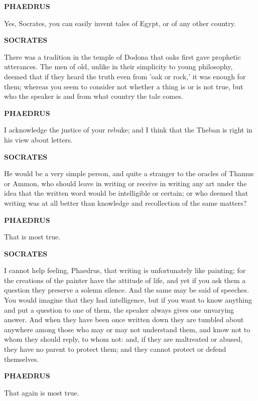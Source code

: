 \documentclass[11pt,letter]{article}
\begin{document}
\par \textbf{PHAEDRUS}
\par   Yes, Socrates, you can easily invent tales of Egypt, or of any other country.

\par \textbf{SOCRATES}
\par   There was a tradition in the temple of Dodona that oaks first gave prophetic utterances. The men of old, unlike in their simplicity to young philosophy, deemed that if they heard the truth even from 'oak or rock,' it was enough for them; whereas you seem to consider not whether a thing is or is not true, but who the speaker is and from what country the tale comes.

\par \textbf{PHAEDRUS}
\par   I acknowledge the justice of your rebuke; and I think that the Theban is right in his view about letters.

\par \textbf{SOCRATES}
\par   He would be a very simple person, and quite a stranger to the oracles of Thamus or Ammon, who should leave in writing or receive in writing any art under the idea that the written word would be intelligible or certain; or who deemed that writing was at all better than knowledge and recollection of the same matters?

\par \textbf{PHAEDRUS}
\par   That is most true.

\par \textbf{SOCRATES}
\par   I cannot help feeling, Phaedrus, that writing is unfortunately like painting; for the creations of the painter have the attitude of life, and yet if you ask them a question they preserve a solemn silence. And the same may be said of speeches. You would imagine that they had intelligence, but if you want to know anything and put a question to one of them, the speaker always gives one unvarying answer. And when they have been once written down they are tumbled about anywhere among those who may or may not understand them, and know not to whom they should reply, to whom not:  and, if they are maltreated or abused, they have no parent to protect them; and they cannot protect or defend themselves.

\par \textbf{PHAEDRUS}
\par   That again is most true.
\end{document}
